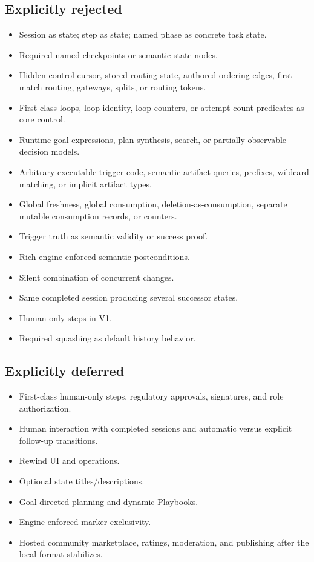 \documentclass[11pt]{article}
\begin{document}
\subsection{Explicitly rejected}

\begin{itemize}
  \item Session as state; step as state; named phase as concrete task state.
  \item Required named checkpoints or semantic state nodes.
  \item Hidden control cursor, stored routing state, authored ordering edges, first-match routing, gateways, splits, or routing tokens.
  \item First-class loops, loop identity, loop counters, or attempt-count predicates as core control.
  \item Runtime goal expressions, plan synthesis, search, or partially observable decision models.
  \item Arbitrary executable trigger code, semantic artifact queries, prefixes, wildcard matching, or implicit artifact types.
  \item Global freshness, global consumption, deletion-as-consumption, separate mutable consumption records, or counters.
  \item Trigger truth as semantic validity or success proof.
  \item Rich engine-enforced semantic postconditions.
  \item Silent combination of concurrent changes.
  \item Same completed session producing several successor states.
  \item Human-only steps in V1.
  \item Required squashing as default history behavior.
\end{itemize}

\subsection{Explicitly deferred}

\begin{itemize}
  \item First-class human-only steps, regulatory approvals, signatures, and role authorization.
  \item Human interaction with completed sessions and automatic versus explicit follow-up transitions.
  \item Rewind UI and operations.
  \item Optional state titles/descriptions.
  \item Goal-directed planning and dynamic Playbooks.
  \item Engine-enforced marker exclusivity.
  \item Hosted community marketplace, ratings, moderation, and publishing after the local format stabilizes.
\end{itemize}
\end{document}
